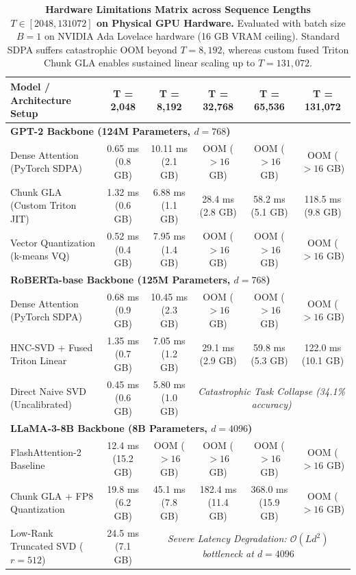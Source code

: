 \documentclass{article}
\begin{document}
\begin{table}[ht]
\centering
\caption{\textbf{Hardware Limitations Matrix across Sequence Lengths $T \in [2048, 131072]$ on Physical GPU Hardware.}
Evaluated with batch size $B=1$ on NVIDIA Ada Lovelace hardware (16 GB VRAM ceiling). Standard SDPA suffers catastrophic OOM beyond $T=8,192$, whereas custom fused Triton Chunk GLA enables sustained linear scaling up to $T=131,072$.}
\label{tab:hardware_limits_matrix}
\scriptsize
\setlength{\tabcolsep}{4.5pt}
\begin{tabular}{lccccc}
\toprule
\textbf{Model / Architecture Setup} & \textbf{T = 2,048} & \textbf{T = 8,192} & \textbf{T = 32,768} & \textbf{T = 65,536} & \textbf{T = 131,072} \\
\midrule
\multicolumn{6}{l}{\textbf{GPT-2 Backbone (124M Parameters, $d=768$)}} \\
Dense Attention (PyTorch SDPA) & 0.65 ms (0.8 GB) & 10.11 ms (2.1 GB) & OOM ($>16$ GB) & OOM ($>16$ GB) & OOM ($>16$ GB) \\
Chunk GLA (Custom Triton JIT) & 1.32 ms (0.6 GB) & 6.88 ms (1.1 GB) & 28.4 ms (2.8 GB) & 58.2 ms (5.1 GB) & 118.5 ms (9.8 GB) \\
Vector Quantization (k-means VQ) & 0.52 ms (0.4 GB) & 7.95 ms (1.4 GB) & OOM ($>16$ GB) & OOM ($>16$ GB) & OOM ($>16$ GB) \\
\midrule
\multicolumn{6}{l}{\textbf{RoBERTa-base Backbone (125M Parameters, $d=768$)}} \\
Dense Attention (PyTorch SDPA) & 0.68 ms (0.9 GB) & 10.45 ms (2.3 GB) & OOM ($>16$ GB) & OOM ($>16$ GB) & OOM ($>16$ GB) \\
HNC-SVD + Fused Triton Linear & 1.35 ms (0.7 GB) & 7.05 ms (1.2 GB) & 29.1 ms (2.9 GB) & 59.8 ms (5.3 GB) & 122.0 ms (10.1 GB) \\
Direct Naive SVD (Uncalibrated) & 0.45 ms (0.6 GB) & 5.80 ms (1.0 GB) & \multicolumn{3}{c}{\textit{Catastrophic Task Collapse (34.1\% accuracy)}} \\
\midrule
\multicolumn{6}{l}{\textbf{LLaMA-3-8B Backbone (8B Parameters, $d=4096$)}} \\
FlashAttention-2 Baseline & 12.4 ms (15.2 GB) & OOM ($>16$ GB) & OOM ($>16$ GB) & OOM ($>16$ GB) & OOM ($>16$ GB) \\
Chunk GLA + FP8 Quantization & 19.8 ms (6.2 GB) & 45.1 ms (7.8 GB) & 182.4 ms (11.4 GB) & 368.0 ms (15.9 GB) & OOM ($>16$ GB) \\
Low-Rank Truncated SVD ($r=512$) & 24.5 ms (7.1 GB) & \multicolumn{4}{c}{\textit{Severe Latency Degradation: $\mathcal{O}(L d^2)$ bottleneck at $d=4096$}} \\
\bottomrule
\end{tabular}
\end{table}
\end{document}
